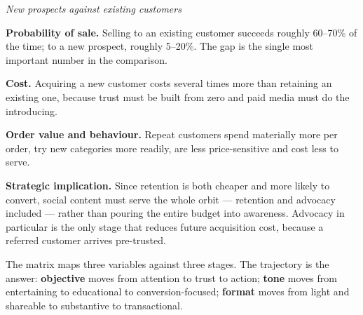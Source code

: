 \begin{qlist}
\textit{New prospects against existing customers}
\begin{apts}\setcounter{enumi}{6}
\item \textbf{Probability of sale.} Selling to an existing customer succeeds
      roughly 60--70\% of the time; to a new prospect, roughly 5--20\%. The gap
      is the single most important number in the comparison.
\item \textbf{Cost.} Acquiring a new customer costs several times more than
      retaining an existing one, because trust must be built from zero and paid
      media must do the introducing.
\item \textbf{Order value and behaviour.} Repeat customers spend materially
      more per order, try new categories more readily, are less price-sensitive
      and cost less to serve.
\item \textbf{Strategic implication.} Since retention is both cheaper and more
      likely to convert, social content must serve the whole orbit --- retention
      and advocacy included --- rather than pouring the entire budget into
      awareness. Advocacy in particular is the only stage that reduces future
      acquisition cost, because a referred customer arrives pre-trusted.
\end{apts}

The matrix maps three variables against three stages. The trajectory is the
answer: \textbf{objective} moves from attention to trust to action;
\textbf{tone} moves from entertaining to educational to conversion-focused;
\textbf{format} moves from light and shareable to substantive to
transactional.


\end{qlist}

